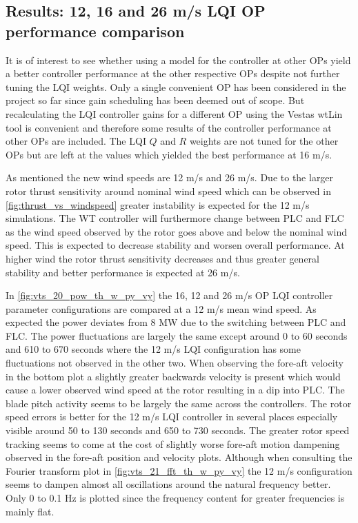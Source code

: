 \clearpage
\subsection{Results: 12, 16 and 26 m/s LQI OP performance comparison}
It is of interest to see whether using a model for the controller at other OPs yield a better controller performance at the other respective OPs despite not further tuning the LQI weights. Only a single convenient OP has been considered in the project so far since gain scheduling has been deemed out of scope. But recalculating the LQI controller gains for a different OP using the Vestas wtLin tool is convenient and therefore some results of the controller performance at other OPs are included. The LQI $ Q $ and $ R $ weights are not tuned for the other OPs but are left at the values which yielded the best performance at 16 m/s.

As mentioned the new wind speeds are 12 m/s and 26 m/s. Due to the larger rotor thrust sensitivity around nominal wind speed which can be observed in \cref{fig:thrust_vs_windspeed} greater instability is expected for the 12 m/s simulations. The WT controller will furthermore change between PLC and FLC as the wind speed observed by the rotor goes above and below the nominal wind speed. This is expected to decrease stability and worsen overall performance. At higher wind the rotor thrust sensitivity decreases and thus greater general stability and better performance is expected at 26 m/s.

In \cref{fig:vts_20_pow_th_w_py_vy} the 16, 12 and 26 m/s OP LQI controller parameter configurations are compared at a 12 m/s mean wind speed. As expected the power deviates from 8 MW due to the switching between PLC and FLC. The power fluctuations are largely the same except around 0 to 60 seconds and 610 to 670 seconds where the 12 m/s LQI configuration has some fluctuations not observed in the other two. When observing the fore-aft velocity in the bottom plot a slightly greater backwards velocity is present which would cause a lower observed wind speed at the rotor resulting in a dip into PLC. The blade pitch activity seems to be largely the same across the controllers. The rotor speed errors is better for the 12 m/s LQI controller in several places especially visible around 50 to 130 seconds and 650 to 730 seconds. The greater rotor speed tracking seems to come at the cost of slightly worse fore-aft motion dampening observed in the fore-aft position and velocity plots. Although when consulting the Fourier transform plot in \cref{fig:vts_21_fft_th_w_py_vy} the 12 m/s configuration seems to dampen almost all oscillations around the natural frequency better. Only 0 to 0.1 Hz is plotted since the frequency content for greater frequencies is mainly flat.


